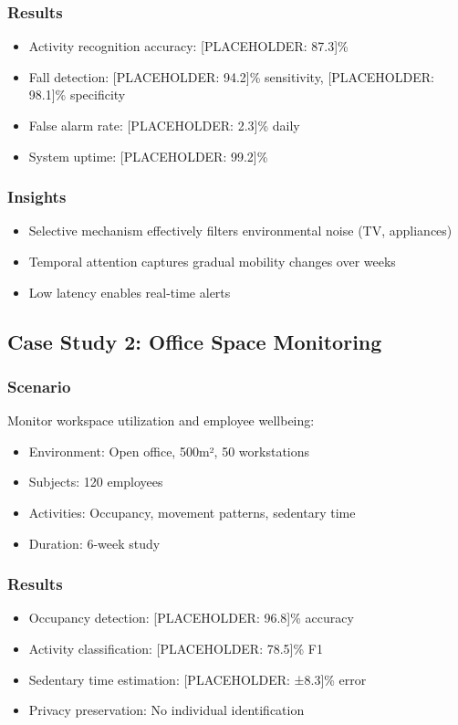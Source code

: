 \documentclass[journal]{IEEEtran}
\begin{document}
\subsubsection{Results}
\begin{itemize}
\item Activity recognition accuracy: [PLACEHOLDER: 87.3]\%
\item Fall detection: [PLACEHOLDER: 94.2]\% sensitivity, [PLACEHOLDER: 98.1]\% specificity
\item False alarm rate: [PLACEHOLDER: 2.3]\% daily
\item System uptime: [PLACEHOLDER: 99.2]\%
\end{itemize}

\subsubsection{Insights}
\begin{itemize}
\item Selective mechanism effectively filters environmental noise (TV, appliances)
\item Temporal attention captures gradual mobility changes over weeks
\item Low latency enables real-time alerts
\end{itemize}

\subsection{Case Study 2: Office Space Monitoring}

\subsubsection{Scenario}
Monitor workspace utilization and employee wellbeing:
\begin{itemize}
\item Environment: Open office, 500m², 50 workstations
\item Subjects: 120 employees
\item Activities: Occupancy, movement patterns, sedentary time
\item Duration: 6-week study
\end{itemize}

\subsubsection{Results}
\begin{itemize}
\item Occupancy detection: [PLACEHOLDER: 96.8]\% accuracy
\item Activity classification: [PLACEHOLDER: 78.5]\% F1
\item Sedentary time estimation: [PLACEHOLDER: ±8.3]\% error
\item Privacy preservation: No individual identification
\end{itemize}
\end{document}
